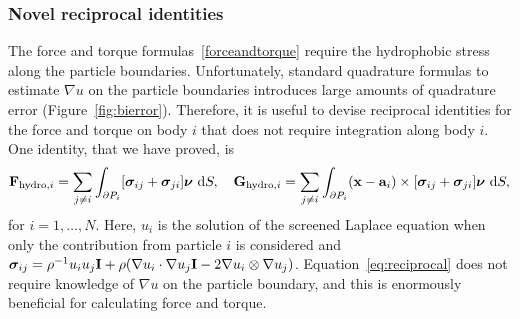 \subsubsection{Novel reciprocal identities}
The force and torque formulas~\eqref{forceandtorque} require the
hydrophobic stress along the particle boundaries. Unfortunately,
standard quadrature formulas to estimate $\nabla u$ on the particle
boundaries introduces large amounts of quadrature error
(Figure~\ref{fig:bierror}). Therefore, it is useful to devise reciprocal
identities for the force and torque on body $i$ that does not
require integration along body $i$. One identity, that we have proved,
is
\begin{align}
    \label{eq:reciprocal}
{\bf F}_{\text{hydro},i} = \sum_{j \neq i} \int_{\partial P_i}[\boldsymbol{\sigma}_{ij} + \boldsymbol{\sigma}_{ji}]\boldsymbol{\nu}\,\dif S,\quad
{\bf G}_{\text{hydro},i} = \sum_{j \neq i} \int_{\partial P_i} ({\bf
  x}-\mathbf{a}_i) \times [\boldsymbol{\sigma}_{ij} +
  \boldsymbol{\sigma}_{ji}]\boldsymbol{\nu}\,\dif S, 
\end{align}
for $i=1,\ldots,N$. Here, $u_i$ is the solution of the screened Laplace
equation when only the contribution from particle $i$ is considered and
$\boldsymbol{\sigma}_{ij} = \rho^{-1} u_iu_j {\bf I} + \rho(\nabla u_i
\cdot \nabla u_j {\bf I} - 2 \nabla u_i \otimes \nabla u_j)$.
Equation~\eqref{eq:reciprocal} does not require knowledge of $\nabla u$
on the particle boundary, and this is enormously beneficial for
calculating force and torque.




